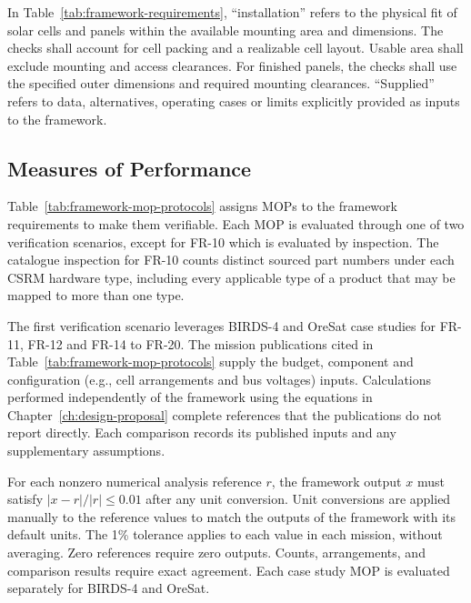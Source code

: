 In Table~\ref{tab:framework-requirements}, ``installation'' refers to the physical fit of solar cells and panels within the available mounting area and dimensions.
The checks shall account for cell packing and a realizable cell layout.
Usable area shall exclude mounting and access clearances.
For finished panels, the checks shall use the specified outer dimensions and required mounting clearances.
``Supplied'' refers to data, alternatives, operating cases or limits explicitly provided as inputs to the framework.

\subsection{Measures of Performance}
\label{subsection:framework-mops}

Table~\ref{tab:framework-mop-protocols} assigns MOPs to the framework requirements \citep[Sec.~17.3.3]{friedenthal2014practical} to make them verifiable.
Each MOP is evaluated through one of two verification scenarios, except for FR-10 which is evaluated by inspection. The catalogue inspection for FR-10 counts distinct sourced part numbers under each CSRM hardware type, including every applicable type of a product that may be mapped to more than one type.

The first verification scenario leverages BIRDS-4 and OreSat case studies for FR-11, FR-12 and FR-14 to FR-20.
The mission publications cited in Table~\ref{tab:framework-mop-protocols} supply the budget, component and configuration (e.g., cell arrangements and bus voltages) inputs.
Calculations performed independently of the framework using the equations in Chapter~\ref{ch:design-proposal} complete references that the publications do not report directly.
Each comparison records its published inputs and any supplementary assumptions.

For each nonzero numerical analysis reference $r$, the framework output $x$ must satisfy $|x-r|/|r|\leq 0.01$ after any unit conversion. Unit conversions are applied manually to the reference values to match the outputs of the framework with its default units. The 1\% tolerance applies to each value in each mission, without averaging. Zero references require zero outputs. Counts, arrangements, and comparison results require exact agreement.
Each case study MOP is evaluated separately for BIRDS-4 and OreSat.


